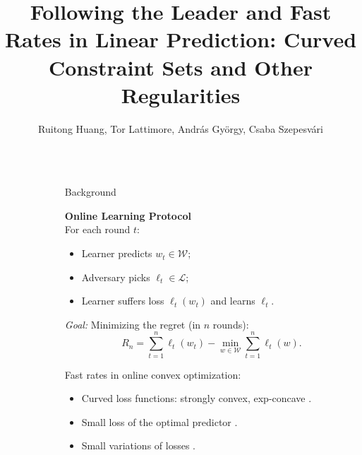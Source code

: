 \documentclass[final]{beamer} %
\title{Following the Leader and Fast Rates in Linear Prediction: Curved Constraint Sets and Other Regularities}
\author{Ruitong Huang, Tor Lattimore, Andr\'as Gy\"orgy, Csaba Szepesv\'{a}ri}
\newcommand{\cL}{\mathcal{L}}
\newcommand{\cW}{\mathcal{W}}
\newcommand{\lt}{\ell_t}
\begin{document}
\begin{frame}[c]
	\vspace{-1.5cm}

	\begin{columns}[t,totalwidth=\textwidth]
	
	\begin{column}{0.01\textwidth}
	\end{column}

		
 	\begin{column}{.24\textwidth}%
	
		\begin{block}{Background}
		\begin{minipage}{.9\linewidth}
			\begin{block}{}
			\vspace{-3.5cm}
			{\centering \bf Online Learning Protocol\\}
			For each round $t$:
				\begin{itemize}
					\item  Learner predicts $w_t\in \cW$;
					\item  Adversary picks $\lt\in \cL$;
					\item  Learner suffers loss $\lt(w_t)$ and learns $\lt$.
				\end{itemize}
			\end{block}	
		\end{minipage}
			
		{\large \it Goal:} Minimizing the regret (in $n$ rounds):
		\[
		R_n = \sum_{t=1}^{n} \lt(w_t) - \min_{w\in\cW} \sum_{t=1}^{n} \lt(w).
		\]
		
		\vspace{1cm}
		{\large Fast rates in online convex optimization:}
		\begin{itemize}
			\item Curved loss functions: strongly convex, exp-concave  \citep{MF92,hazan2007logarithmic,bartlett2007adaptive,kakade2009mind,orabona2012beyond,vanerven2015fast}.
			\item Small loss of the optimal predictor  \citep{FrSc97}.
			\item Small variations of losses   \citep{RakhlinS13}.
		\end{itemize}
	

\end{block}
\end{column}
\end{columns}
\end{frame}
\end{document}
